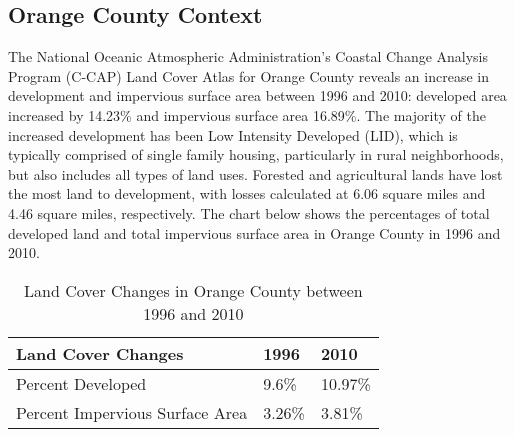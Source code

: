 \subsection*{Orange County Context}
The National Oceanic Atmospheric Administration’s Coastal Change Analysis 
Program (C-CAP) Land Cover Atlas for Orange County reveals an increase in 
development and impervious surface area between 1996 and 2010: developed area 
increased by 14.23\% and impervious surface area 16.89\%. The majority of the 
increased development has been Low Intensity Developed (LID), which is 
typically comprised of single family housing, particularly in rural 
neighborhoods, but also includes all types of land uses. Forested and 
agricultural lands have lost the most land to development, with losses 
calculated at 6.06 square miles and 4.46 square miles, respectively. The chart 
below shows the percentages of total developed land and total impervious surface 
area in Orange County in 1996 and 2010.
\begin{table}[ht]
\begin{center}
    \begin{tabular}{| l | l | l |}
    \hline
    Land Cover Changes & 1996 & 2010 \\ \hline
    Percent Developed & 9.6\% & 10.97\% \\
    Percent Impervious Surface Area & 3.26\% & 3.81\% \\ \hline
    \end{tabular}
    \label{tab:lc_change}
    \caption{Land Cover Changes in Orange County between 1996 and 2010}
\end{center}
\end{table}

